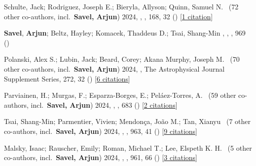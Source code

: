 \item[{\color{numcolor}\scriptsize34}] Schulte, Jack; Rodriguez, Joseph E.; Bieryla, Allyson; Quinn, Samuel N. \etal\ ({72} other co-authors, incl.\ \textbf{Savel, Arjun}) 2024, , \aj, {168}, 32 () [\href{https://ui.adsabs.harvard.edu/abs/2024AJ....168...32S}{1 citation}]

\item[{\color{numcolor}\scriptsize33}] \textbf{Savel}, \textbf{Arjun}; Beltz, Hayley; Komacek, Thaddeus D.; Tsai, Shang-Min , , \apj, {969} ()

\item[{\color{numcolor}\scriptsize32}] Polanski, Alex S.; Lubin, Jack; Beard, Corey; Akana Murphy, Joseph M. \etal\ ({70} other co-authors, incl.\ \textbf{Savel, Arjun}) 2024, , The Astrophysical Journal Supplement Series, {272}, 32 () [\href{https://ui.adsabs.harvard.edu/abs/2024ApJS..272...32P}{6 citations}]

\item[{\color{numcolor}\scriptsize31}] Parviainen, H.; Murgas, F.; Esparza-Borges, E.; Pel{\'a}ez-Torres, A. \etal\ ({59} other co-authors, incl.\ \textbf{Savel, Arjun}) 2024, , \aanda, {683} () [\href{https://ui.adsabs.harvard.edu/abs/2024A&A...683A.170P}{2 citations}]

\item[{\color{numcolor}\scriptsize30}] Tsai, Shang-Min; Parmentier, Vivien; Mendon{\c{c}}a, Jo{\~a}o M.; Tan, Xianyu \etal\ ({7} other co-authors, incl.\ \textbf{Savel, Arjun}) 2024, , \apj, {963}, 41 () [\href{https://ui.adsabs.harvard.edu/abs/2024ApJ...963...41T}{9 citations}]

\item[{\color{numcolor}\scriptsize29}] Malsky, Isaac; Rauscher, Emily; Roman, Michael T.; Lee, Elspeth K. H. \etal\ ({5} other co-authors, incl.\ \textbf{Savel, Arjun}) 2024, , \apj, {961}, 66 () [\href{https://ui.adsabs.harvard.edu/abs/2024ApJ...961...66M}{3 citations}]

